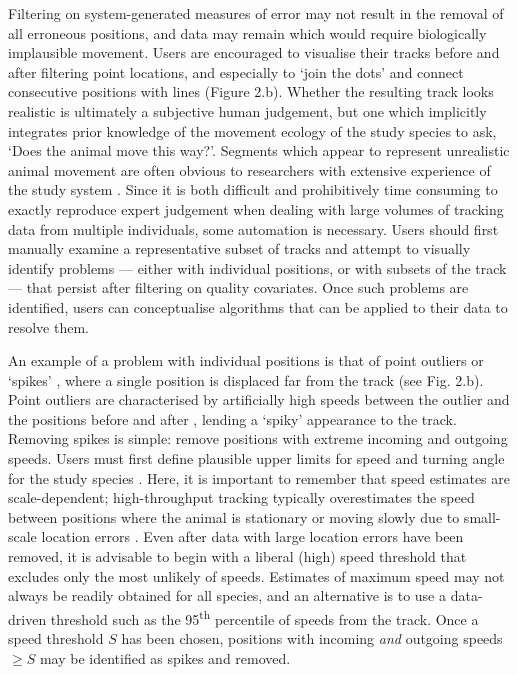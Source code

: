 \documentclass[10pt,paper=a4,headings=standardclasses
]{scrartcl}
\begin{document}
Filtering on system-generated measures of error may not result in the removal of all erroneous positions, and data may remain which would require biologically implausible movement.
Users are encouraged to visualise their tracks before and after filtering point locations, and especially to `join the dots' and connect consecutive positions with lines (Figure 2.b).
Whether the resulting track looks realistic is ultimately a subjective human judgement, but one which implicitly integrates prior knowledge of the movement ecology of the study species to ask, `Does the animal move this way?'.
Segments which appear to represent unrealistic animal movement are often obvious to researchers with extensive experience of the study system \citep[the non-movement approach; see][]{bjorneraas2010}.
Since it is both difficult and prohibitively time consuming to exactly reproduce expert judgement when dealing with large volumes of tracking data from multiple individuals, some automation is necessary.
Users should first manually examine a representative subset of tracks and attempt to visually identify problems --- either with individual positions, or with subsets of the track --- that persist after filtering on quality covariates.
Once such problems are identified, users can conceptualise algorithms that can be applied to their data to resolve them.

An example of a problem with individual positions is that of point outliers or `spikes' \citep{bjorneraas2010}, where a single position is displaced far from the track (see Fig. 2.b).
Point outliers are characterised by artificially high speeds between the outlier and the positions before and after \citep[called incoming and outgoing speed, respectively][]{bjorneraas2010}, lending a `spiky' appearance to the track.
Removing spikes is simple: remove positions with extreme incoming and outgoing speeds.
Users must first define plausible upper limits for speed and turning angle for the study species \citep{calenge2009, seidel2018}.
Here, it is important to remember that speed estimates are scale-dependent; high-throughput tracking typically overestimates the speed between positions where the animal is stationary or moving slowly due to small-scale location errors \citep{ranacher2016, noonan2019}. 
Even after data with large location errors have been removed, it is advisable to begin with a liberal (high) speed threshold that excludes only the most unlikely of speeds.
Estimates of maximum speed may not always be readily obtained for all species, and an alternative is to use a data-driven threshold such as the 95\textsuperscript{th} percentile of speeds from the track.
Once a speed threshold $S$ has been chosen, positions with incoming \textit{and} outgoing speeds $\geq S$ may be identified as spikes and removed.
\end{document}
